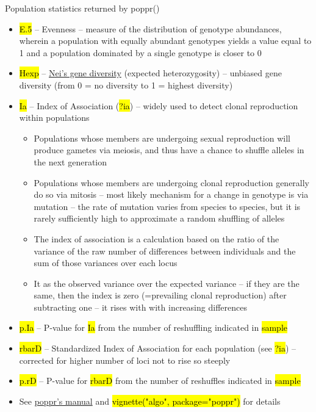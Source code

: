 \documentclass[compress, ucs, xelatex, 11pt, xcolor=svgnames,
  hyperref={
    bookmarks=true,
    unicode=true,
    colorlinks=true,
    pdftitle={Molecular data in R},
    plainpages=false,
    pdfauthor={Vojtech Zeisek},
    pdfsubject={Course about phylogeny and evolution in R},
    pdfcreator={XeLaTeX},
    pdfkeywords={R, evolution, phylogeny, molecular data},
    linkcolor=Tomato,
    anchorcolor=SaddleBrown,
    citecolor=Goldenrod,
    filecolor=DarkMagenta,
    menucolor=Sienna,
    urlcolor=DarkTurquoise,
    pdftex},
  url={hyphens, lowtilde} %
  ]{beamer}
\renewcommand{\texttt}[1]{\hl{\ttfamily #1}}
\begin{document}
\begin{frame}[allowframebreaks]{Population statistics returned by poppr()}
\begin{itemize}
    \item \texttt{E.5} -- Evenness -- measure of the distribution of genotype abundances, wherein a population with equally abundant genotypes yields a value equal to 1 and a population dominated by a single genotype is closer to 0
    \item \texttt{Hexp} -- \href{http://www.genetics.org/content/89/3/583}{Nei's gene diversity} (expected heterozygosity) -- unbiased gene diversity (from 0 = no diversity to 1 = highest diversity)
    \item \texttt{Ia} -- Index of Association (\texttt{?ia}) -- widely used to detect clonal reproduction within populations
    \begin{itemize}
      \item Populations whose members are undergoing sexual reproduction will produce gametes via meiosis, and thus have a chance to shuffle alleles in the next generation
      \item Populations whose members are undergoing clonal reproduction generally do so via mitosis -- most likely mechanism for a change in genotype is via mutation -- the rate of mutation varies from species to species, but it is rarely sufficiently high to approximate a random shuffling of alleles
      \item The index of association is a calculation based on the ratio of the variance of the raw number of differences between individuals and the sum of those variances over each locus
      \item It as the observed variance over the expected variance -- if they are the same, then the index is zero (=prevailing clonal reproduction) after subtracting one -- it rises with with increasing differences
    \end{itemize}
    \item \texttt{p.Ia} -- P-value for \texttt{Ia} from the number of reshuffling indicated in \texttt{sample}
    \item \texttt{rbarD} -- Standardized Index of Association for each population (see \texttt{?ia}) -- corrected for higher number of loci not to rise so steeply
    \item \texttt{p.rD} -- P-value for \texttt{rbarD} from the number of reshuffles indicated in \texttt{sample}
    \item See \href{https://grunwaldlab.github.io/Population_Genetics_in_R/}{poppr's manual} and \texttt{vignette("algo", package="poppr")} for details
  \end{itemize}
\end{frame}
\end{document}
